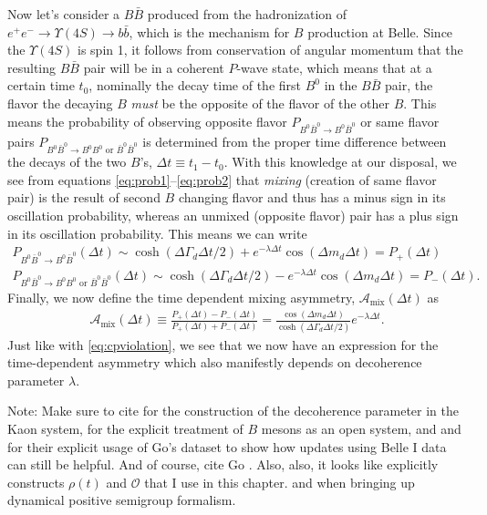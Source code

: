 Now let's consider a $B\bar{B}$ produced from the hadronization of $e^+e^-\rightarrow \Upsilon(4S)\rightarrow b\bar{b}$, which is the mechanism for $B$ production at Belle. Since the $\Upsilon(4S)$ is spin 1, it follows from conservation of angular momentum that the resulting $B\bar{B}$ pair will be in a coherent $P$-wave state, which means that at a certain time $t_0$, nominally the decay time of the first $B^0$ in the $B\bar{B}$ pair, the flavor the decaying $B$ \textit{must} be the opposite of the flavor of the other $B$. This means the probability of observing opposite flavor $P_{B^0\bar{B}^0\rightarrow B^0\bar{B}^0}$ or same flavor pairs $P_{B^0\bar{B}^0\rightarrow B^0B^0 \text{ or } \bar{B}^0\bar{B}^0}$ is determined from the proper time difference between the decays of the two $B$'s, $\Delta t\equiv t_1-t_0$. With this knowledge at our disposal, we see from equations \ref{eq:prob1}--\ref{eq:prob2} that \textit{mixing} (creation of same flavor pair) is the result of second $B$ changing flavor and thus has a minus sign in its oscillation probability, whereas an unmixed (opposite flavor) pair has a plus sign in its oscillation probability. This means we can write
\begin{align}
P_{B^{0}\bar{B}^0\rightarrow B^{0}\bar{B}^0}(\Delta t) \sim \cosh(\Delta \Gamma_d \Delta t/2)+e^{-\lambda \Delta t}\cos(\Delta m_d\Delta t) = P_+(\Delta t)\\
P_{B^{0}\bar{B}^0\rightarrow B^{0}B^0\text{ or } \bar{B}^0\bar{B}^0}(\Delta t) \sim \cosh(\Delta \Gamma_d \Delta t/2)-e^{-\lambda \Delta t}\cos(\Delta m_d\Delta t) = P_-(\Delta t).
\end{align}
Finally, we now define the time dependent mixing asymmetry, $\mathcal{A}_\text{mix}(\Delta t)$ as
\begin{align}
\mathcal{A}_\text{mix}(\Delta t)\equiv \frac{P_+(\Delta t)-P_-(\Delta t)}{P_+(\Delta t)+P_-(\Delta t)} = \frac{\cos(\Delta m_d\Delta t)}{\cosh(\Delta \Gamma_d \Delta t/2)}e^{-\lambda\Delta t}.
\end{align}
Just like with \ref{eq:cpviolation}, we see that we now have an expression for the time-dependent asymmetry which also manifestly depends on decoherence parameter $\lambda$.

Note: Make sure to cite \cite{Bertlmann} for the construction of the decoherence parameter in the Kaon system, \cite{Banerjee} for the explicit treatment of $B$ mesons as an open system, \cite{Benatti} and \cite{Dixit} and \cite{ALOK} for their explicit usage of Go's dataset to show how updates using Belle I data can still be helpful. And of course, cite Go \cite{Go}. Also, also, it looks like \cite{Naikoo} explicitly constructs $\rho(t)$ and $\mathcal{O}$ that I use in this chapter. \cite{Lindblad} and \cite{Gorini} when bringing up dynamical positive semigroup formalism. 

